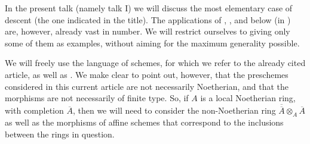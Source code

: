 In the present talk (namely talk I) we will discuss the most elementary case of descent (the one indicated in the title).
The applications of , , and  below (in ) are, however, already vast in number.
We will restrict ourselves to giving only some of them as examples, without aiming for the maximum generality possible.

We will freely use the language of schemes, for which we refer to the already cited article, as well as \cite{GR1958}.
We make clear to point out, however, that the preschemes considered in this current article are not necessarily Noetherian, and that the morphisms are not necessarily of finite type.
So, if $A$ is a local Noetherian ring, with completion $\overline{A}$, then we will need to consider the non-Noetherian ring $\overline{\overline{A}}\otimes_A\overline{A}$ as well as the morphisms of affine schemes that correspond to the inclusions between the rings in question.
